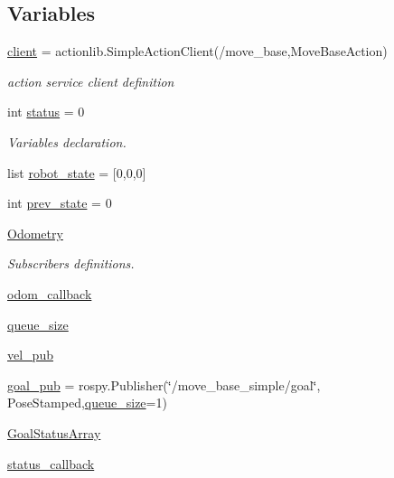\subsection*{Variables}
\begin{DoxyCompactItemize}
\item 
\hyperlink{namespaceBehaviors_a480c99d5a0219bba3f364d4022512bda}{client} = actionlib.\+Simple\+Action\+Client(\textquotesingle{}/move\+\_\+base\textquotesingle{},Move\+Base\+Action)
\begin{DoxyCompactList}\small\item\em action service client definition \end{DoxyCompactList}\item 
int \hyperlink{namespaceBehaviors_a7ea0e9c25ae327630daf14912540597f}{status} = 0
\begin{DoxyCompactList}\small\item\em Variables declaration. \end{DoxyCompactList}\item 
list \hyperlink{namespaceBehaviors_a7fda1c0de76b996b876dad16ed5c7cf5}{robot\+\_\+state} = \mbox{[}0,0,0\mbox{]}
\item 
int \hyperlink{namespaceBehaviors_a2de241e90497b66cefc28211136d938b}{prev\+\_\+state} = 0
\item 
\hyperlink{namespaceBehaviors_a458a2eb75561d95075537ee82dea289c}{Odometry}
\begin{DoxyCompactList}\small\item\em Subscribers definitions. \end{DoxyCompactList}\item 
\hyperlink{namespaceBehaviors_a53b9b8729733e5fde4c917a2068d6c92}{odom\+\_\+callback}
\item 
\hyperlink{namespaceBehaviors_a182345f6e56bfb62f2fe95e488624da4}{queue\+\_\+size}
\item 
\hyperlink{namespaceBehaviors_a56b79b8920b23a79eb3459479c6342eb}{vel\+\_\+pub}
\item 
\hyperlink{namespaceBehaviors_ad0289fe265166267c21567f44c2ecba7}{goal\+\_\+pub} = rospy.\+Publisher(\char`\"{}/move\+\_\+base\+\_\+simple/goal\char`\"{}, Pose\+Stamped,\hyperlink{namespaceBehaviors_a182345f6e56bfb62f2fe95e488624da4}{queue\+\_\+size}=1)
\item 
\hyperlink{namespaceBehaviors_a53817d008ea8a92222a7b07415fd0e7e}{Goal\+Status\+Array}
\item 
\hyperlink{namespaceBehaviors_a151c2aa7ae62991aea8bc9a08e0e641b}{status\+\_\+callback}
\item 

\end{DoxyCompactItemize}
